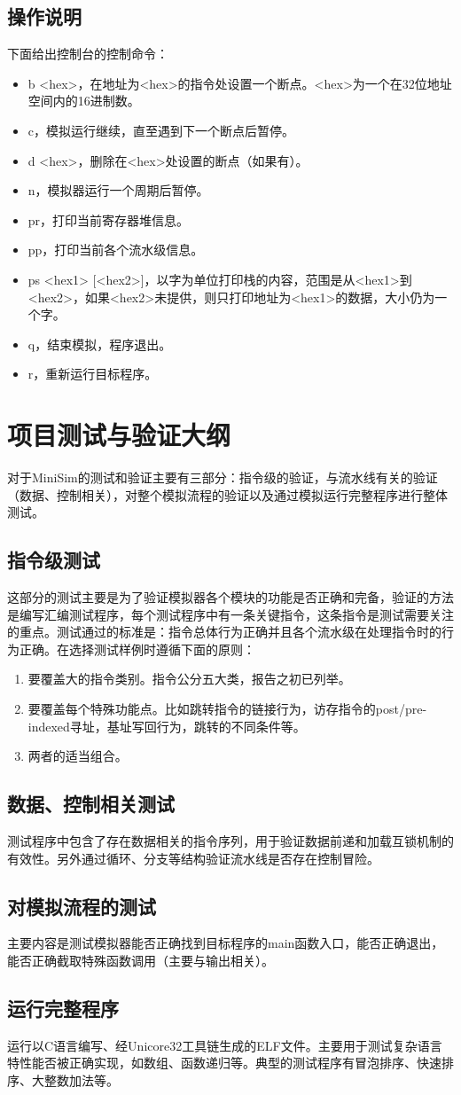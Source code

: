\documentclass[12pt,a4paper,Flow]{report}
\begin{document}
\section{操作说明}
下面给出控制台的控制命令：
\begin{itemize}
\item b <hex>，在地址为<hex>的指令处设置一个断点。<hex>为一个在32位地址空间内的16进制数。
\item c，模拟运行继续，直至遇到下一个断点后暂停。
\item d <hex>，删除在<hex>处设置的断点（如果有）。
\item n，模拟器运行一个周期后暂停。
\item pr，打印当前寄存器堆信息。
\item pp，打印当前各个流水级信息。
\item ps <hex1> [<hex2>]，以字为单位打印栈的内容，范围是从<hex1>到<hex2>，如果<hex2>未提供，则只打印地址为<hex1>的数据，大小仍为一个字。
\item q，结束模拟，程序退出。
\item r，重新运行目标程序。
\end{itemize}
\chapter{项目测试与验证大纲}
对于MiniSim的测试和验证主要有三部分：指令级的验证，与流水线有关的验证（数据、控制相关），对整个模拟流程的验证以及通过模拟运行完整程序进行整体测试。
\section{指令级测试}
这部分的测试主要是为了验证模拟器各个模块的功能是否正确和完备，验证的方法是编写汇编测试程序，每个测试程序中有一条关键指令，这条指令是测试需要关注的重点。测试通过的标准是：指令总体行为正确并且各个流水级在处理指令时的行为正确。在选择测试样例时遵循下面的原则：
\begin{enumerate}
\item 要覆盖大的指令类别。指令公分五大类，报告之初已列举。
\item 要覆盖每个特殊功能点。比如跳转指令的链接行为，访存指令的post/pre-indexed寻址，基址写回行为，跳转的不同条件等。
\item 两者的适当组合。
\end{enumerate}
\section{数据、控制相关测试}
测试程序中包含了存在数据相关的指令序列，用于验证数据前递和加载互锁机制的有效性。另外通过循环、分支等结构验证流水线是否存在控制冒险。
\section{对模拟流程的测试}
主要内容是测试模拟器能否正确找到目标程序的main函数入口，能否正确退出，能否正确截取特殊函数调用（主要与输出相关）。
\section{运行完整程序}
运行以C语言编写、经Unicore32工具链生成的ELF文件。主要用于测试复杂语言特性能否被正确实现，如数组、函数递归等。典型的测试程序有冒泡排序、快速排序、大整数加法等。
\end{document}
